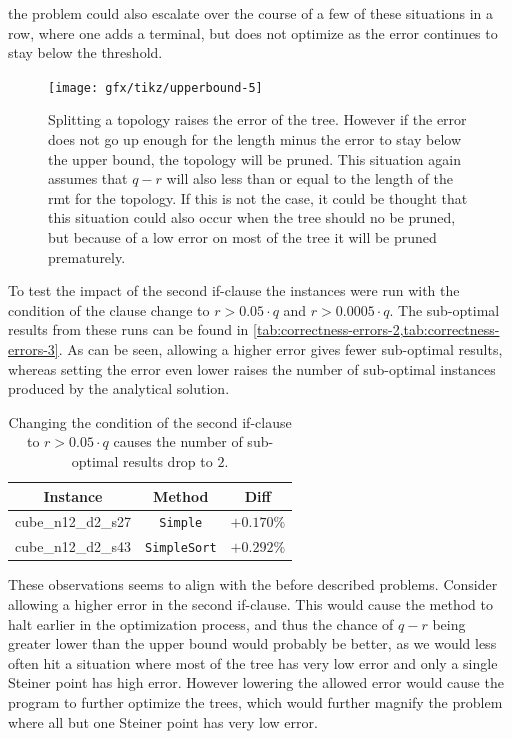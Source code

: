 the problem could also escalate over the course of a few of these situations in
a row, where one adds a terminal, but does not optimize as the error continues
to stay below the threshold.

\begin{figure}[htbp]
  \centering
  \texttt{[image: gfx/tikz/upperbound-5]}
  \caption[Upper bounds, 5]{Splitting a topology raises the error of the tree.
    However if the error does not go up enough for the length minus the error to
    stay below the upper bound, the topology will be pruned. This situation
    again assumes that $q-r$ will also less than or equal to the length of the
    \ac{rmt} for the topology. If this is not the case, it could be thought that
    this situation could also occur when the tree should no be pruned, but
    because of a low error on most of the tree it will be pruned
    prematurely.\label{fig:upperbound-5}}
\end{figure}

To test the impact of the second if-clause the instances were run with the
condition of the clause change to $r > 0.05 \cdot q$ and $r > 0.0005 \cdot q$.
The sub-optimal results from these runs can be found in
\cref{tab:correctness-errors-2,tab:correctness-errors-3}. As can be seen, allowing a
higher error gives fewer sub-optimal results, whereas setting the error even
lower raises the number of sub-optimal instances produced by the analytical
solution.

\begin{table}[htbp]
  \centering
  \begin{tabular}{ccc}
    \toprule
    Instance           & Method              & Diff       \\
    \midrule
    cube\_n12\_d2\_s27 & \texttt{Simple}     & $+0.170\%$ \\
    cube\_n12\_d2\_s43 & \texttt{SimpleSort} & $+0.292\%$ \\
    \bottomrule
  \end{tabular}
  \caption[Sub-optimal results with condition $r > 0.05 \cdot q$]{Changing
    the condition of the second if-clause to $r > 0.05 \cdot q$ causes the
    number of sub-optimal results drop to $2$.\label{tab:correctness-errors-3}}
\end{table}

These observations seems to align with the before described problems.
Consider allowing a higher error in the second if-clause. This would cause the
method to halt earlier in the optimization process, and thus the chance of $q-r$
being greater lower than the upper bound would probably be better, as we would
less often hit a situation where most of the tree has very low error and only a
single Steiner point has high error. However lowering the allowed error would
cause the program to further optimize the trees, which would further magnify the
problem where all but one Steiner point has very low error.

